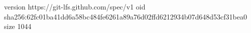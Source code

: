 version https://git-lfs.github.com/spec/v1
oid sha256:62fc01ba41dd6a58bc484fe6261a89a76d02ffd6212934b07d648d53cf31bea0
size 1044
